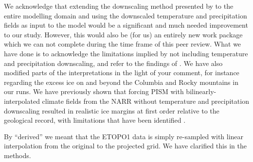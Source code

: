 We acknowledge that extending the downscaling method presented by
\citet{Jarosch.etal.2012} to the entire modelling domain and using the
downscaled temperature and precipitation fields as input to the model would be
a significant and much needed improvement to our study. However, this would
also be (for us) an entirely new work package which we can not complete during
the time frame of this peer review. What we have done is to acknowledge the
limitations implied by not including temperature and precipitation downscaling,
and refer to the findings of \citet{Jarosch.etal.2012}. We have also modified
parts of the interpretations in the light of your comment, for instance
regarding the excess ice on and beyond the Columbia and Rocky mountains in our
runs. We have previously shown that forcing PISM with bilinearly-interpolated
climate fields from the NARR without temperature and precipitation downscaling
resulted in realistic ice margins at first order relative to the geological
record, with limitations that have been identified \citep{Seguinot.etal.2014}.


By ``derived'' we meant that the ETOPO1 data is simply re-sampled with linear
interpolation from the original to the projected grid. We have clarified this in
the methods.

